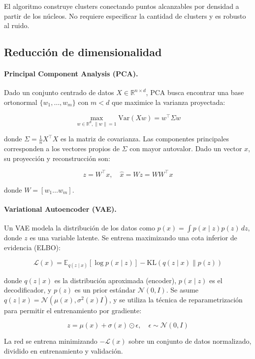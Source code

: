 \documentclass[11pt]{article}
\begin{document}
El algoritmo construye clusters conectando puntos alcanzables por densidad a partir de los núcleos. No requiere especificar la cantidad de clusters y es robusto al ruido.

\subsection*{Reducción de dimensionalidad}

\paragraph{Principal Component Analysis (PCA).} Dado un conjunto centrado de datos $X \in \mathbb{R}^{n \times d}$, PCA busca encontrar una base ortonormal $\{w_1, \dots, w_m\}$ con $m < d$ que maximice la varianza proyectada:

\[
\max_{w \in \mathbb{R}^d, \|w\| = 1} \mathrm{Var}(Xw) = w^\top \Sigma w
\]

donde $\Sigma = \frac{1}{n} X^\top X$ es la matriz de covarianza. Las componentes principales corresponden a los vectores propios de $\Sigma$ con mayor autovalor. Dado un vector $x$, su proyección y reconstrucción son:

\[
z = W^\top x, \quad \hat{x} = W z = W W^\top x
\]

donde $W = [w_1 \dots w_m]$.

\paragraph{Variational Autoencoder (VAE).} Un VAE modela la distribución de los datos como $p(x) = \int p(x \mid z) p(z) \, dz$, donde $z$ es una variable latente. Se entrena maximizando una cota inferior de evidencia (ELBO):

\[
\mathcal{L}(x) = \mathbb{E}_{q(z \mid x)}[\log p(x \mid z)] - \mathrm{KL}(q(z \mid x) \| p(z))
\]

donde $q(z \mid x)$ es la distribución aproximada (encoder), $p(x \mid z)$ es el decodificador, y $p(z)$ es un prior estándar $\mathcal{N}(0, I)$. Se asume $q(z \mid x) = \mathcal{N}(\mu(x), \sigma^2(x) I)$, y se utiliza la técnica de reparametrización para permitir el entrenamiento por gradiente:

\[
z = \mu(x) + \sigma(x) \odot \epsilon, \quad \epsilon \sim \mathcal{N}(0, I)
\]

La red se entrena minimizando $-\mathcal{L}(x)$ sobre un conjunto de datos normalizado, dividido en entrenamiento y validación.
\end{document}
